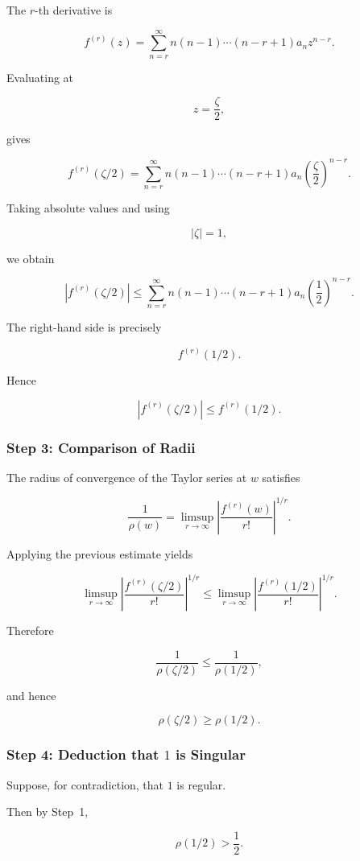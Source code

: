 \documentclass[12pt,a4paper]{article}
\theoremstyle{notespace}
\begin{document}
The \(r\)-th derivative is

\[
f^{(r)}(z)
=
\sum_{n=r}^{\infty}
n(n-1)\cdots(n-r+1)
a_n
z^{n-r}.
\]

Evaluating at

\[
z=\frac{\zeta}{2},
\]

gives

\[
f^{(r)}(\zeta/2)
=
\sum_{n=r}^{\infty}
n(n-1)\cdots(n-r+1)
a_n
\left(\frac{\zeta}{2}\right)^{n-r}.
\]

Taking absolute values and using

\[
|\zeta|=1,
\]

we obtain

\[
|f^{(r)}(\zeta/2)|
\le
\sum_{n=r}^{\infty}
n(n-1)\cdots(n-r+1)
a_n
\left(\frac12\right)^{n-r}.
\]

The right-hand side is precisely

\[
f^{(r)}(1/2).
\]

Hence

\[
\boxed{
	|f^{(r)}(\zeta/2)|
	\le
	f^{(r)}(1/2).
}
\]

\subsubsection*{Step 3: Comparison of Radii}

The radius of convergence of the Taylor series at \(w\) satisfies

\[
\frac1{\rho(w)}
=
\limsup_{r\to\infty}
\left|
\frac{f^{(r)}(w)}{r!}
\right|^{1/r}.
\]

Applying the previous estimate yields

\[
\limsup_{r\to\infty}
\left|
\frac{f^{(r)}(\zeta/2)}{r!}
\right|^{1/r}
\le
\limsup_{r\to\infty}
\left|
\frac{f^{(r)}(1/2)}{r!}
\right|^{1/r}.
\]

Therefore

\[
\frac1{\rho(\zeta/2)}
\le
\frac1{\rho(1/2)},
\]

and hence

\[
\boxed{
	\rho(\zeta/2)
	\ge
	\rho(1/2).
}
\]

\subsubsection*{Step 4: Deduction that \(1\) is Singular}

Suppose, for contradiction, that \(1\) is regular.

Then by Step~1,

\[
\rho(1/2)
>
\frac12.
\]
\end{document}
